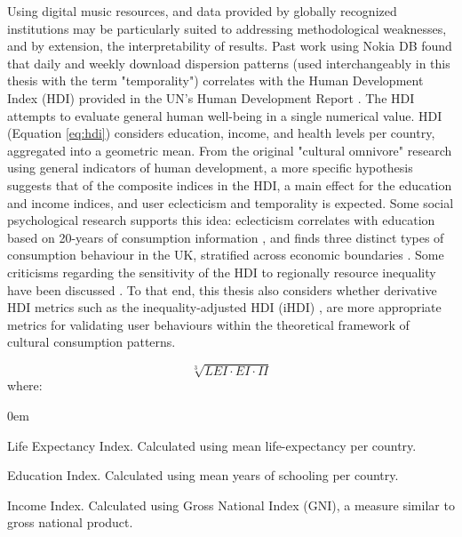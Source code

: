 \documentclass[a4paper]{article}
\begin{document}
Using digital music resources, and data provided by globally recognized institutions may be particularly suited to addressing methodological weaknesses, and by extension, the interpretability of results. Past work using Nokia DB \cite{woolhouse2013work,woolhouse2014every} found that daily and weekly download dispersion patterns (used interchangeably in this thesis with the term "temporality") correlates with the Human Development Index (\Gls{HDI}) provided in the \Gls{UN}'s Human Development Report \cite{ul1995reflections}. The \Gls{HDI} attempts to evaluate general human well-being in a single numerical value. \Gls{HDI} (Equation \ref{eq:hdi}) considers education, income, and health levels per country, aggregated into a geometric mean. From the original "cultural omnivore" research using general indicators of human development, a more specific hypothesis suggests that of the composite indices in the \Gls{HDI}, a main effect for the education and income indices, and user eclecticism and temporality is expected. Some social psychological research supports this idea: eclecticism correlates with education based on 20-years of consumption information \cite{lopez2005exclusive}, and \cite{le2008class} finds three distinct types of consumption behaviour in the UK, stratified across economic boundaries \cite{le2008class}. Some criticisms regarding the sensitivity of the \Gls{HDI} to regionally resource inequality have been discussed \cite{chowdhury1991human,sagar1998human}. To that end, this thesis also considers whether derivative \Gls{HDI} metrics such as the inequality-adjusted HDI (\Gls{iHDI}) \cite{hicks1997inequality}, are more appropriate metrics for validating user behaviours within the theoretical framework of cultural consumption patterns.

\begin{equation}
\sqrt[3]{LEI \cdot EI \cdot II}
\label{eq:hdi}
\end{equation}
where:
\begin{description}\itemsep0em
\item[LEI:] Life Expectancy Index. Calculated using mean life-expectancy per country.
\item[EI:] Education Index. Calculated using mean years of schooling per country.
\item[II:] Income Index. Calculated using Gross National Index (GNI), a measure similar to gross national product.
\end{description}
\end{document}

